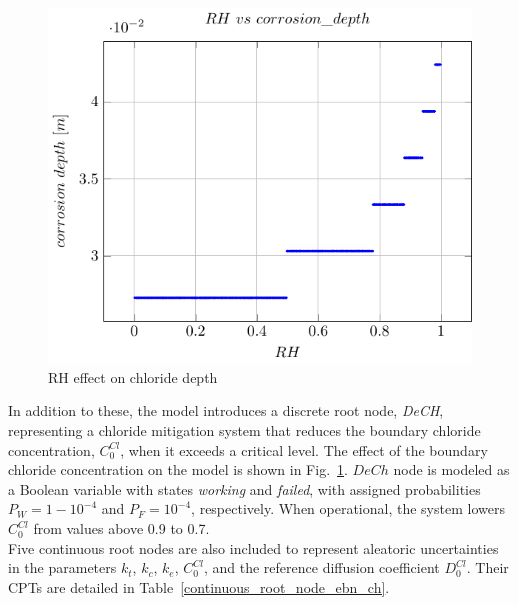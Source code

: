 \begin{figure}[H]
    \centering
    \includegraphics[width=\linewidth]{imgs/pdfs/11_RH_corr.pdf}
    \caption{RH effect on chloride depth}\label{Chloride vs RH}
\end{figure}
In addition to these, the model introduces a discrete root node, \textit{DeCH}, representing a chloride mitigation system that reduces the boundary chloride concentration, $C_0^{Cl}$, when it exceeds a critical level. The effect of the boundary chloride concentration on the model is shown in Fig.~\ref{Chloride vs RH}. $DeCh$ node is modeled as a Boolean variable with states \textit{working} and \textit{failed}, with assigned probabilities $P_W = 1 - 10^{-4}$ and $P_F = 10^{-4}$, respectively. When operational, the system lowers $C_0^{Cl}$ from values above 0.9 to 0.7. \\
Five continuous root nodes are also included to represent aleatoric uncertainties in the parameters $k_t$, $k_c$, $k_e$, $C_0^{Cl}$, and the reference diffusion coefficient $D_0^{Cl}$. Their CPTs are detailed in Table~\ref{continuous_root_node_ebn_ch}.

